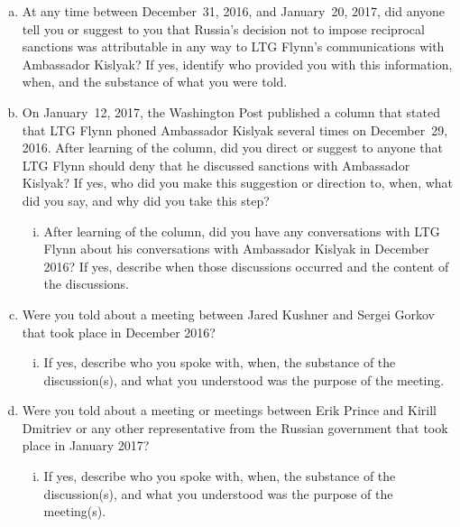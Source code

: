 \begin{enumerate}[a.]
\begin{enumerate}[i.]
\end{enumerate}

\item At any time between December~31, 2016, and January~20, 2017, did anyone tell you or suggest to you that Russia's decision not to impose reciprocal sanctions was attributable in any way to LTG Flynn's communications with Ambassador Kislyak?
If yes, identify who provided you with this information, when, and the substance of what you were told.

\item On January~12, 2017, the Washington Post published a column that stated that LTG Flynn phoned Ambassador Kislyak several times on December~29, 2016.
After learning of the column, did you direct or suggest to anyone that LTG Flynn should deny that he discussed sanctions with Ambassador Kislyak?
If yes, who did you make this suggestion or direction to, when, what did you say, and why did you take this step?

\begin{enumerate}[i.]

\item After learning of the column, did you have any conversations with LTG Flynn about his conversations with Ambassador Kislyak in December 2016?
If yes, describe when those discussions occurred and the content of the discussions.

\end{enumerate}

\item Were you told about a meeting between Jared Kushner and Sergei Gorkov that took place in December 2016?

\begin{enumerate}[i.]

\item If yes, describe who you spoke with, when, the substance of the discussion(s), and what you understood was the purpose of the meeting.

\end{enumerate}

\item Were you told about a meeting or meetings between Erik Prince and Kirill Dmitriev or any other representative from the Russian government that took place in January 2017?

\begin{enumerate}[i.]

\item If yes, describe who you spoke with, when, the substance of the discussion(s), and what you understood was the purpose of the meeting(s).


\end{enumerate}
\end{enumerate}

